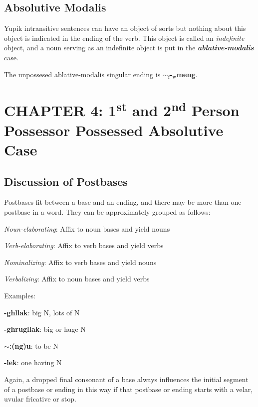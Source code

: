 \documentclass{article}
\begin{document}
\subsection{Absolutive Modalis}

Yupik intransitive sentences can have an object of sorts but nothing about this object is indicated in the ending of the verb.
%
This object is called an \textit{indefinite} object, and a noun serving as an indefinite object is put in the \textit{\textbf{ablative-modalis}} case.

The unpossesed ablative-modalis singular ending is \textbf{$\sim_\text{f}$-$_\text{w}$meng}.


\section{CHAPTER 4: 1\textsuperscript{st} and 2\textsuperscript{nd} Person Possessor Possessed Absolutive Case}

\subsection{Discussion of Postbases}

Postbases fit between a base and an ending, and there may be more than one postbase in a word.
%
They can be approximately grouped as follows:

\begin{description}
\item \textit{Noun-elaborating}: Affix to noun bases and yield nouns
\item \textit{Verb-elaborating}: Affix to verb bases and yield verbs
\item \textit{Nominalizing}: Affix to verb bases and yield nouns
\item \textit{Verbalizing}: Affix to noun bases and yield verbs
\end{description}

Examples:

\begin{description}
\item \textbf{-ghllak}: big N, lots of N
\item \textbf{-ghrugllak}: big or huge N
\item \textbf{$\sim$:(ng)u}: to be N
\item \textbf{-lek}: one having N
\end{description}

Again, a dropped final consonant of a base always influences the initial segment of a postbase or ending in this way if that postbase or ending starts with a velar, uvular fricative or stop.
\end{document}
